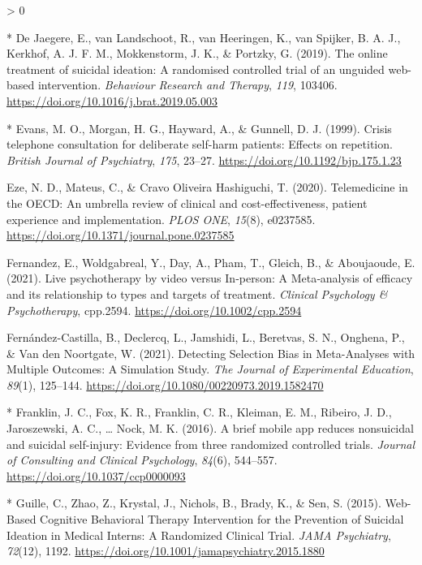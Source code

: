 \documentclass[
  english,
  man]{apa6}
\newlength{\cslhangindent}
\newenvironment{CSLReferences}[2] %
 {%
  \setlength{\parindent}{0pt}
  \ifodd #1 \everypar{\setlength{\hangindent}{\cslhangindent}}\ignorespaces\fi
  \ifnum #2 > 0
  \setlength{\parskip}{#2\baselineskip}
  \fi
 }%
 {}
\begin{document}
\begin{CSLReferences}{1}{0}
\leavevmode\hypertarget{ref-dejaegere2019}{}%
* De Jaegere, E., van Landschoot, R., van Heeringen, K., van Spijker, B. A. J., Kerkhof, A. J. F. M., Mokkenstorm, J. K., \& Portzky, G. (2019). The online treatment of suicidal ideation: A randomised controlled trial of an unguided web-based intervention. \emph{Behaviour Research and Therapy}, \emph{119}, 103406. \url{https://doi.org/10.1016/j.brat.2019.05.003}

\leavevmode\hypertarget{ref-evans1999}{}%
* Evans, M. O., Morgan, H. G., Hayward, A., \& Gunnell, D. J. (1999). Crisis telephone consultation for deliberate self-harm patients: Effects on repetition. \emph{British Journal of Psychiatry}, \emph{175}, 23--27. \url{https://doi.org/10.1192/bjp.175.1.23}

\leavevmode\hypertarget{ref-eze2020}{}%
Eze, N. D., Mateus, C., \& Cravo Oliveira Hashiguchi, T. (2020). Telemedicine in the {OECD}: An umbrella review of clinical and cost-effectiveness, patient experience and implementation. \emph{PLOS ONE}, \emph{15}(8), e0237585. \url{https://doi.org/10.1371/journal.pone.0237585}

\leavevmode\hypertarget{ref-fernandez2021}{}%
Fernandez, E., Woldgabreal, Y., Day, A., Pham, T., Gleich, B., \& Aboujaoude, E. (2021). Live psychotherapy by video versus {In}‐person: A {Meta}‐analysis of efficacy and its relationship to types and targets of treatment. \emph{Clinical Psychology \& Psychotherapy}, cpp.2594. \url{https://doi.org/10.1002/cpp.2594}

\leavevmode\hypertarget{ref-fernandez-castilla2021}{}%
Fernández-Castilla, B., Declercq, L., Jamshidi, L., Beretvas, S. N., Onghena, P., \& Van den Noortgate, W. (2021). Detecting {Selection Bias} in {Meta}-{Analyses} with {Multiple Outcomes}: A {Simulation Study}. \emph{The Journal of Experimental Education}, \emph{89}(1), 125--144. \url{https://doi.org/10.1080/00220973.2019.1582470}

\leavevmode\hypertarget{ref-franklin2016}{}%
* Franklin, J. C., Fox, K. R., Franklin, C. R., Kleiman, E. M., Ribeiro, J. D., Jaroszewski, A. C., \ldots{} Nock, M. K. (2016). A brief mobile app reduces nonsuicidal and suicidal self-injury: Evidence from three randomized controlled trials. \emph{Journal of Consulting and Clinical Psychology}, \emph{84}(6), 544--557. \url{https://doi.org/10.1037/ccp0000093}

\leavevmode\hypertarget{ref-guille2015}{}%
* Guille, C., Zhao, Z., Krystal, J., Nichols, B., Brady, K., \& Sen, S. (2015). Web-{Based Cognitive Behavioral Therapy Intervention} for the {Prevention} of {Suicidal Ideation} in {Medical Interns}: A {Randomized Clinical Trial}. \emph{JAMA Psychiatry}, \emph{72}(12), 1192. \url{https://doi.org/10.1001/jamapsychiatry.2015.1880}


\end{CSLReferences}
\end{document}
